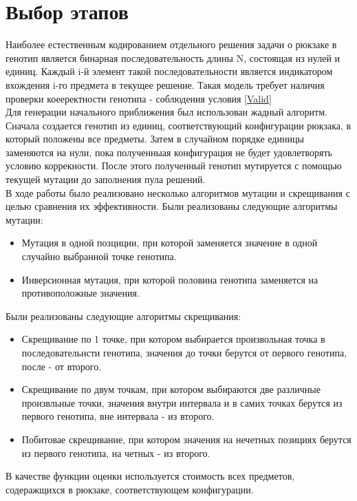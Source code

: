 \section{Выбор этапов}%
Наиболее естественным кодированием отдельного решения задачи о рюкзаке в генотип является бинарная последовательность длины N, состоящая из нулей и единиц.
Каждый i-й элемент такой последовательности является индикатором вхождения i-го предмета в текущее решение. Такая модель требует наличия проверки коееректности генотипа - соблюдения условия \ref{Valid} 
\\ Для генерации начального приближения был использован жадный алгоритм. Сначала создается генотип из единиц, соответствующий конфигурации рюкзака, в который положены все предметы. Затем в случайном порядке единицы заменяются на нули, пока полученныая конфигурация не будет удовлетворять условию коррекности. После этого полученный генотип мутируется с помощью текущей мутации до заполнения пула решений.
\\ В ходе работы было реализовано несколько алгоритмов мутации и скрещивания с целью сравнения их эффективности. Были реализованы следующие алгоритмы мутации:
\begin{itemize}
	\item Мутация в одной позциции, при которой заменяется значение в одной случайно выбранной точке генотипа.
	\item Инверсионная мутация, при которой половина генотипа заменяется на противоположные значения.
\end{itemize}
 Были реализованы следующие алгоритмы скрещивания:
 \begin{itemize}
	\item Скрещивание по 1 точке, при котором выбирается произвольная точка в последовательнсти генотипа, значения до точки берутся от первого генотипа, после - от второго. 
	\item Скрещивание по двум точкам, при котором выбираются две различные произвльные точки, значения внутри интервала и в самих точках берутся из первого генотипа, вне интервала - из второго. 
	\item Побитовае скрещивание, при котором значения на нечетных позициях берутся из первого генотипа, на четных - из второго.  
 \end{itemize}
 В качестве функции оценки используется стоимость всех предметов, содеражщихся в рюкзаке, соответствующем конфигурации.
 \\
